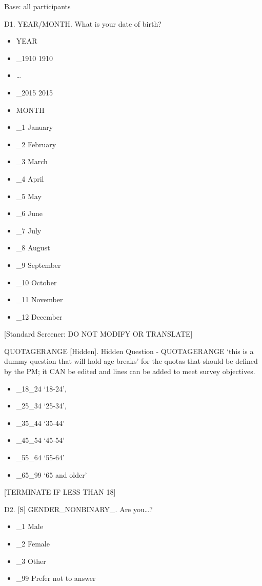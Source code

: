 \documentclass[
  12pt,
  a4paper,
]{article}
\providecommand{\tightlist}{%
  \setlength{\itemsep}{0pt}\setlength{\parskip}{0pt}}
\begin{document}
Base: all participants

D1. YEAR/MONTH. What is your date of birth?

\begin{itemize}
\tightlist
\item
  YEAR
\item
  \_1910 1910
\item
  \ldots{}
\item
  \_2015 2015
\item
  MONTH
\item
  \_1 January
\item
  \_2 February
\item
  \_3 March
\item
  \_4 April
\item
  \_5 May
\item
  \_6 June
\item
  \_7 July
\item
  \_8 August
\item
  \_9 September
\item
  \_10 October
\item
  \_11 November
\item
  \_12 December
\end{itemize}

{[}Standard Screener: DO NOT MODIFY OR TRANSLATE{]}

QUOTAGERANGE {[}Hidden{]}. Hidden Question - QUOTAGERANGE `this is a dummy question that will hold age breaks' for the quotas that should be defined by the PM; it CAN be edited and lines can be added to meet survey objectives.

\begin{itemize}
\tightlist
\item
  \_18\_24 `18-24',
\item
  \_25\_34 `25-34',
\item
  \_35\_44 `35-44'
\item
  \_45\_54 `45-54'
\item
  \_55\_64 `55-64'
\item
  \_65\_99 `65 and older'
\end{itemize}

{[}TERMINATE IF LESS THAN 18{]}

D2. {[}S{]} GENDER\_NONBINARY\_. Are you\ldots?

\begin{itemize}
\tightlist
\item
  \_1 Male
\item
  \_2 Female
\item
  \_3 Other
\item
  \_99 Prefer not to answer
\end{itemize}
\end{document}
